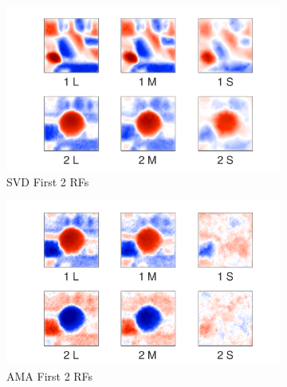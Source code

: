 \documentclass{jov}
\begin{document}
\begin{figure}
\centering
\begin{subfigure}[b]{0.27 \textwidth}
		\centering
        \includegraphics[width=\textwidth]{../Figures/Figure6/Figure6_a.pdf}
        \caption{SVD First 2 RFs}
        \label{fig:case10SVD}
    \end{subfigure}
    \begin{subfigure}[b]{0.27 \textwidth}   
        \includegraphics[width=\textwidth]{../Figures/Figure6/Figure6_b.pdf}
        \caption{AMA First 2 RFs}
        \label{fig:case10AMA}
    \end{subfigure}
        \begin{subfigure}[b]{0.20 \textwidth}

\end{subfigure}
\end{figure}
\end{document}
